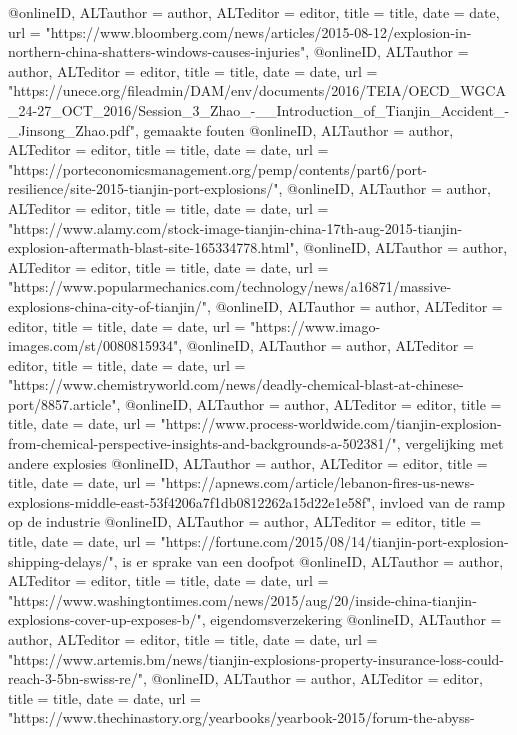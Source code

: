 {{{{{{{{{{{@online{ID,	ALTauthor = {author},	ALTeditor = {editor},	title = {title},	date = {date},	url = {"https://www.bloomberg.com/news/articles/2015-08-12/explosion-in-northern-china-shatters-windows-causes-injuries"},}
@online{ID,	ALTauthor = {author},	ALTeditor = {editor},	title = {title},	date = {date},	url = {"https://unece.org/fileadmin/DAM/env/documents/2016/TEIA/OECD_WGCA_24-27_OCT_2016/Session_3_Zhao_-__Introduction_of_Tianjin_Accident_-_Jinsong_Zhao.pdf"},}
gemaakte fouten
@online{ID,	ALTauthor = {author},	ALTeditor = {editor},	title = {title},	date = {date},	url = {"https://porteconomicsmanagement.org/pemp/contents/part6/port-resilience/site-2015-tianjin-port-explosions/"},}
@online{ID,	ALTauthor = {author},	ALTeditor = {editor},	title = {title},	date = {date},	url = {"https://www.alamy.com/stock-image-tianjin-china-17th-aug-2015-tianjin-explosion-aftermath-blast-site-165334778.html"},}
@online{ID,	ALTauthor = {author},	ALTeditor = {editor},	title = {title},	date = {date},	url = {"https://www.popularmechanics.com/technology/news/a16871/massive-explosions-china-city-of-tianjin/"},}
@online{ID,	ALTauthor = {author},	ALTeditor = {editor},	title = {title},	date = {date},	url = {"https://www.imago-images.com/st/0080815934"},}
@online{ID,	ALTauthor = {author},	ALTeditor = {editor},	title = {title},	date = {date},	url = {"https://www.chemistryworld.com/news/deadly-chemical-blast-at-chinese-port/8857.article"},}
@online{ID,	ALTauthor = {author},	ALTeditor = {editor},	title = {title},	date = {date},	url = {"https://www.process-worldwide.com/tianjin-explosion-from-chemical-perspective-insights-and-backgrounds-a-502381/"},}
vergelijking met andere explosies
@online{ID,	ALTauthor = {author},	ALTeditor = {editor},	title = {title},	date = {date},	url = {"https://apnews.com/article/lebanon-fires-us-news-explosions-middle-east-53f4206a7f1db0812262a15d22e1e58f"},}
invloed van de ramp op de industrie
@online{ID,	ALTauthor = {author},	ALTeditor = {editor},	title = {title},	date = {date},	url = {"https://fortune.com/2015/08/14/tianjin-port-explosion-shipping-delays/"},}
is er sprake van een doofpot
@online{ID,	ALTauthor = {author},	ALTeditor = {editor},	title = {title},	date = {date},	url = {"https://www.washingtontimes.com/news/2015/aug/20/inside-china-tianjin-explosions-cover-up-exposes-b/"},}
eigendomsverzekering
@online{ID,	ALTauthor = {author},	ALTeditor = {editor},	title = {title},	date = {date},	url = {"https://www.artemis.bm/news/tianjin-explosions-property-insurance-loss-could-reach-3-5bn-swiss-re/"},}
@online{ID,	ALTauthor = {author},	ALTeditor = {editor},	title = {title},	date = {date},	url = {"https://www.thechinastory.org/yearbooks/yearbook-2015/forum-the-abyss-%
}}}}}}}}}}}}}
